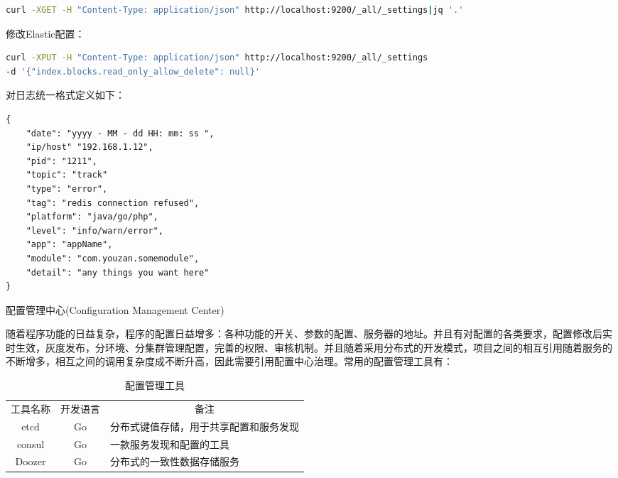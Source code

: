 \documentclass[8pt]{book}
\makeatletter
\numberwithin{dummy}{section}
\theoremstyle{ocrenumbox}
\theoremstyle{blacknumex}
\theoremstyle{blacknumbox}
\theoremstyle{ocrenum}
\renewcommand{\section}{\@startsection{section}{1}{\z@}
	{-4ex \@plus -1ex \@minus -.4ex}
	{1ex \@plus.2ex }
	{\normalfont\large\sffamily\bfseries}}
\makeatother
\begin{document}
\begin{lstlisting}[language=Bash]
curl -XGET -H "Content-Type: application/json" http://localhost:9200/_all/_settings|jq '.'
\end{lstlisting}

修改Elastic配置：

\begin{lstlisting}[language=Bash]
curl -XPUT -H "Content-Type: application/json" http://localhost:9200/_all/_settings 
-d '{"index.blocks.read_only_allow_delete": null}'
\end{lstlisting}

对日志统一格式定义如下：


\begin{lstlisting}
{
	"date": "yyyy - MM - dd HH: mm: ss ",
	"ip/host" "192.168.1.12",
	"pid": "1211",
	"topic": "track"
	"type": "error",
	"tag": "redis connection refused",
	"platform": "java/go/php",
	"level": "info/warn/error",
	"app": "appName",
	"module": "com.youzan.somemodule",
	"detail": "any things you want here"
}
\end{lstlisting}

\section{配置管理中心(Configuration Management Center)}

随着程序功能的日益复杂，程序的配置日益增多：各种功能的开关、参数的配置、服务器的地址。并且有对配置的各类要求，配置修改后实时生效，灰度发布，分环境、分集群管理配置，完善的权限、审核机制。并且随着采用分布式的开发模式，项目之间的相互引用随着服务的不断增多，相互之间的调用复杂度成不断升高，因此需要引用配置中心治理。常用的配置管理工具有：

\begin{table}[htbp]
	\caption{配置管理工具}
	\label{table:configmanagementtool}
	\begin{center}
		\begin{tabular}{|c|c|p{8cm}|}
			\hline
			\multirow{1}{*}{工具名称}
			& \multicolumn{1}{c|}{开发语言} 
			& \multicolumn{1}{c|}{备注}\\			
			\cline{1-3}
			etcd &  Go  & 分布式键值存储，用于共享配置和服务发现 \\
			\hline
			consul & Go &  一款服务发现和配置的工具 \\
			\hline
			Doozer & Go & 分布式的一致性数据存储服务 \\
			\hline							
		\end{tabular}	
	\end{center}
\end{table}
\end{document}
